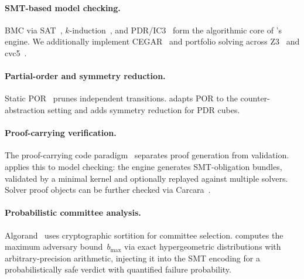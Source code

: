 \paragraph{SMT-based model checking.}
BMC via SAT~\cite{BiereCCSZ1999}, $k$-induction~\cite{SheehySSS2000},
and PDR/IC3~\cite{Bradley2011} form the algorithmic core of
\tarsier{}'s engine.  We additionally implement
CEGAR~\cite{ClarkeGJLV2000} and portfolio solving across
Z3~\cite{DeMoura2008} and cvc5~\cite{BarbosaBBKLMMMN2022}.

\paragraph{Partial-order and symmetry reduction.}
Static POR~\cite{Peled1993, Godefroid1996} prunes independent
transitions.  \tarsier{} adapts POR to the counter-abstraction setting
and adds symmetry reduction for PDR cubes.

\paragraph{Proof-carrying verification.}
The proof-carrying code paradigm~\cite{Necula1997} separates proof
generation from validation.  \tarsier{} applies this to model checking:
the engine generates SMT-obligation bundles, validated by a minimal
kernel and optionally replayed against multiple solvers.  Solver proof
objects can be further checked via Carcara~\cite{Carcara2023}.

\paragraph{Probabilistic committee analysis.}
Algorand~\cite{GiladHMVZ2017, Micali2017} uses cryptographic sortition
for committee selection.  \tarsier{} computes the maximum adversary
bound~$b_{\max}$ via exact hypergeometric distributions with
arbitrary-precision arithmetic, injecting it into the SMT encoding for
a probabilistically safe verdict with quantified failure probability.
